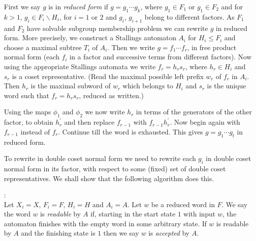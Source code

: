 \documentclass[a4paper,12pt]{article}
\numberwithin{equation}{section}
\numberwithin{figure}{section}
\begin{document}
First we say $g$ is in \emph{reduced form} if $g = g_1 \cdots g_k$, where
$g_1 \in F_1$ or $g_1 \in F_2$ and 
for 
$k > 1$,    $g_i \in F_i \backslash H_i$, for $i=1$ or $2$ 
 and $g_i$, ${g_{i+1}}$ belong to different factors. As $F_1$ and 
$F_2$ have solvable subgroup membership problem we can rewrite $g$ in
reduced form. More precisely, we construct a Stallings automaton $A_i$ for
$H_i\le F_i$ and choose a maximal subtree $T_i$ of $A_i$. 
Then we write $g=f_1\cdots f_r$, in free product normal
form (each $f_i$ in a factor and successive terms from different factors).
Now using the appropriate Stallings automata we write $f_r=h_rs_r$, where
$h_r\in H_i$ and $s_r$ is a coset representative. (Read the maximal 
possible left prefix $w_r$ of $f_r$ in $A_i$. Then $h_r$ is the 
maximal subword of $w_r$ which belongs to $H_i$ and $s_r$ is the
unique word such that $f_r=h_rs_r$, reduced as written.)

Using the maps $\phi_1$ and $\phi_2$ we now write $h_r$ in terms of the
generators of the other factor, to obtain $h^\prime_r$ and then 
replace $f_{r-1}$ with $f_{r-1}h^\prime_r$. Now begin again with
$f_{r-1}$ instead of $f_r$. Continue till the word is exhausted.   
This gives $g=g_1\cdots g_t$ in reduced form.

To rewrite in double coset normal form we need to  
 rewrite
each $g_i$ in double coset normal form in its factor, 
with respect to some (fixed) set
of double coset representatives.  We shall show that the following algorithm does this.\\[1em]

\begin{comment}
${g = h_1(X_1)s_1h_2(X_2)t_2h_3(X_1) \cdots}$

$k=1 \Rightarrow$ $g \in F_1$ or $g \in F_2$



Let ${\Gamma_{H_1}}$ be a folded subgroup graph of $H_1$. Take two copies.

For some word $w = h_1sh_2$, the question is how to find $s$.\\[1em]
\end{comment}

:\\[1em]
Let $X_i=X$, $F_i=F$,  $H_i=H$ and  $A_i=A$.
Let $w$ be a reduced word in $F$. 
We say the word $w$ is {\em readable} by $A$ if, starting in the 
start state $1$ with input $w$, the automaton finishes with the empty
word in some arbitrary state. If $w$ is readable by $A$ and the finishing
state is $1$ then we say $w$ is {\em accepted} by $A$.  
  
\end{document}
